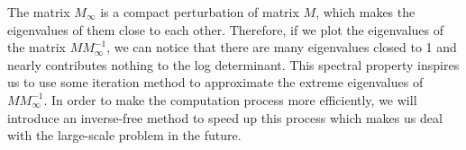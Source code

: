 {\color {blue} The matrix $M_{\infty}$ is a compact perturbation of matrix $M$, which makes the eigenvalues of them close to each other. Therefore, if we plot the eigenvalues of 
the matrix $MM_{\infty}^{-1}$, we can notice that there are many eigenvalues closed to 1 and nearly contributes nothing to the log determinant. This spectral property
inspires us to use some iteration method to approximate the extreme eigenvalues of $MM_{\infty}^{-1}$. In order to make the computation process more efficiently, 
we will introduce an inverse-free method to speed up this process which makes us deal with the large-scale problem in the future.}